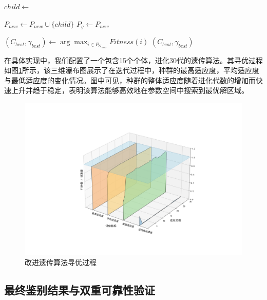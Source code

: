 \begin{algorithm}[H]
\begin{algorithmic}[1]
                        \State $child \leftarrow$  
                    \EndIf
                    
                    \State $P_{new} \leftarrow P_{new} \cup \{child\}$
                \EndFor
                \State $P_g \leftarrow P_{new}$ 
            \EndFor
            
            \State $(C_{best}, \gamma_{best}) \leftarrow \arg\max_{i \in P_{G_{max}}} Fitness(i)$ 
            \State \Return $(C_{best}, \gamma_{best})$
        \EndFunction
    \end{algorithmic}
\end{algorithm}

在具体实现中，我们配置了一个包含15个个体，进化30代的遗传算法。其寻优过程如图\ref{fig:iga_process}所示，该三维瀑布图展示了在迭代过程中，种群的最高适应度，平均适应度与最低适应度的变化情况。图中可见，种群的整体适应度随着进化代数的增加而快速上升并趋于稳定，表明该算法能够高效地在参数空间中搜索到最优解区域。

\begin{figure}[H]
    \centering
    \includegraphics[width=\textwidth]{figs/5问题三/IGA_SVM寻优过程3D瀑布图_最终版.png}
    \caption{改进遗传算法寻优过程}
    \label{fig:iga_process}
\end{figure}

\subsection{最终鉴别结果与双重可靠性验证}

